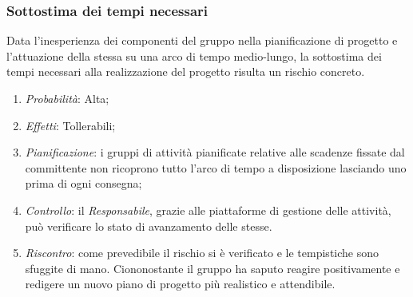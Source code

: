 		\subsubsection{Sottostima dei tempi necessari}

Data l'inesperienza dei componenti del gruppo nella pianificazione di progetto e l'attuazione della stessa su una arco di tempo medio-lungo, la sottostima dei tempi necessari alla realizzazione del progetto risulta un rischio concreto.

\begin{enumerate}
\item \textit{Probabilità}: Alta;
\item \textit{Effetti}: Tollerabili;
\item \textit{Pianificazione}: i gruppi di attività pianificate relative alle scadenze fissate dal committente non ricoprono tutto l'arco di tempo a disposizione lasciando uno  prima di ogni consegna; 
\item \textit{Controllo}: il \textit{Responsabile}, grazie alle piattaforme di gestione delle attività, può verificare lo stato di avanzamento delle stesse.
\item \textit{Riscontro}: come prevedibile il rischio si è verificato e le tempistiche sono sfuggite di mano. Ciononostante il gruppo ha saputo reagire positivamente e redigere un nuovo piano di progetto più realistico e attendibile.
\end{enumerate}
